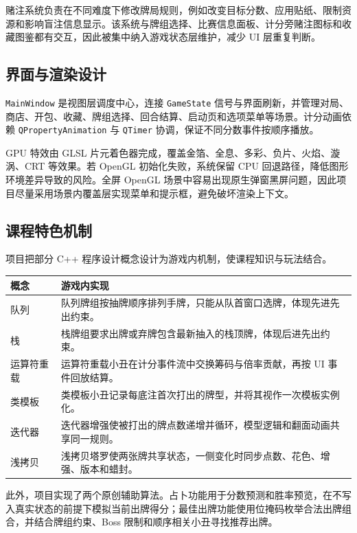 \documentclass[UTF8,11pt,a4paper]{ctexart}
\newcommand{\code}[1]{\texttt{\small #1}}
\begin{document}
赌注系统负责在不同难度下修改牌局规则，例如改变目标分数、应用贴纸、限制资源和影响盲注信息显示。该系统与牌组选择、比赛信息面板、计分旁赌注图标和收藏图鉴都有交互，因此被集中纳入游戏状态层维护，减少 UI 层重复判断。

\subsection{界面与渲染设计}

\code{MainWindow} 是视图层调度中心，连接 \code{GameState} 信号与界面刷新，并管理对局、商店、开包、收藏、牌组选择、回合结算、启动页和选项菜单等场景。计分动画依赖 \code{QPropertyAnimation} 与 \code{QTimer} 协调，保证不同分数事件按顺序播放。

GPU 特效由 GLSL 片元着色器完成，覆盖金箔、全息、多彩、负片、火焰、漩涡、CRT 等效果。若 OpenGL 初始化失败，系统保留 CPU 回退路径，降低图形环境差异导致的风险。全屏 OpenGL 场景中容易出现原生弹窗黑屏问题，因此项目尽量采用场景内覆盖层实现菜单和提示框，避免破坏渲染上下文。

\subsection{课程特色机制}

项目把部分 C++ 程序设计概念设计为游戏内机制，使课程知识与玩法结合。

\begin{center}
\small
\begin{tabularx}{\textwidth}{L{2.4cm}Y}
\toprule
{}
概念 & 游戏内实现 \\
\midrule
队列 & 队列牌组按抽牌顺序排列手牌，只能从队首窗口选牌，体现先进先出约束。 \\
栈 & 栈牌组要求出牌或弃牌包含最新抽入的栈顶牌，体现后进先出约束。 \\
运算符重载 & 运算符重载小丑在计分事件流中交换筹码与倍率贡献，再按 UI 事件回放结算。 \\
类模板 & 类模板小丑记录每底注首次打出的牌型，并将其视作一次模板实例化。 \\
迭代器 & 迭代器增强使被打出的牌点数递增并循环，模型逻辑和翻面动画共享同一规则。 \\
浅拷贝 & 浅拷贝塔罗使两张牌共享状态，一侧变化时同步点数、花色、增强、版本和蜡封。 \\
\bottomrule
\end{tabularx}
\end{center}

此外，项目实现了两个原创辅助算法。占卜功能用于分数预测和胜率预览，在不写入真实状态的前提下模拟当前出牌得分；最佳出牌功能使用位掩码枚举合法出牌组合，并结合牌组约束、Boss 限制和顺序相关小丑寻找推荐出牌。
\end{document}
